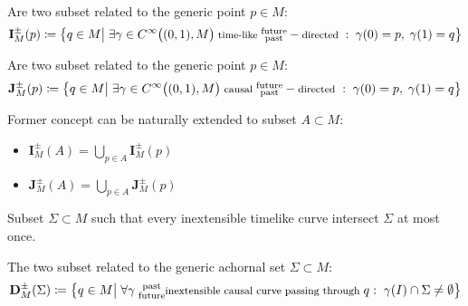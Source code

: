 \documentclass[Main]{subfiles}
\begin{document}
	\begin{definition}
		Are two subset related to the generic point $p	\in M$:
		\begin{displaymath}
			\mathbf{I}_M^\pm(p) \coloneqq \big\{ q \in M \big\vert \; \exists \gamma \in C^\infty\big((0,1), M\big)\;  \textrm{\footnotesize time-like } \substack{\textrm{future}\\ \textrm{past} } -\textrm{\footnotesize directed }:\; \gamma(0)=p,\; \gamma(1)=q  \big\}
		\end{displaymath}
	\end{definition}
	
	\begin{definition}
		Are two subset related to the generic point $p	\in M$:
		\begin{displaymath}
			\mathbf{J}_M^\pm(p) \coloneqq \big\{ q \in M \big\vert \; \exists \gamma \in C^\infty\big((0,1), M\big)\; \textrm{\footnotesize causal } \substack{\textrm{future}\\ \textrm{past} } -\textrm{\footnotesize directed }:\; \gamma(0)=p,\; \gamma(1)=q  \big\}
		\end{displaymath}		
	\end{definition}

	\begin{notationfix}
		Former concept can be naturally extended to subset $A \subset M$:
			\begin{itemize}
				\item $\mathbf{I}_M^\pm(A) = \bigcup_{p\in A} \mathbf{I}_M^\pm(p) $
				\item $\mathbf{J}_M^\pm(A) = \bigcup_{p\in A} \mathbf{J}_M^\pm(p) $
			\end{itemize}
	\end{notationfix}

	\begin{definition}
		Subset $\Sigma \subset M$ such that every inextensible timelike curve intersect $\Sigma$ at most once.
	\end{definition}

	\begin{definition}
		The two subset related to the generic achornal set $\Sigma \subset M$:
		\begin{displaymath}		
			\mathbf{D}_M^\pm(\Sigma) \coloneqq \big\{ q \in M \big\vert \; \forall \gamma \substack{\textrm{ past}\\ \textrm{ future} }\textrm{\footnotesize inextensible causal curve passing through }q : \; \gamma(I) \cap \Sigma \neq \emptyset  \big\}
		\end{displaymath}		
	\end{definition}
\end{document}
